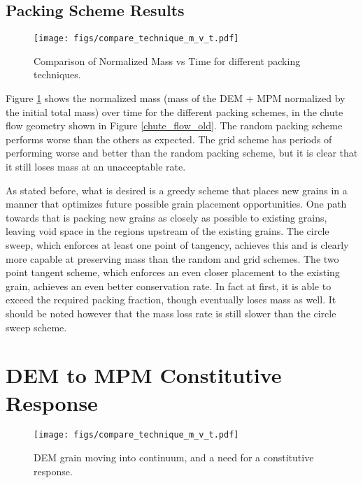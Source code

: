 \subsection{Packing Scheme Results}

\begin{figure}[htp] 
    \centering
    \texttt{[image: figs/compare\_technique\_m\_v\_t.pdf]}
    \caption{Comparison of Normalized Mass vs Time for different packing techniques.}
    \label{packing_compare}
\end{figure}

Figure \ref{packing_compare} shows the normalized mass (mass of the DEM + MPM normalized by the initial total mass) over time for the different packing schemes, in the chute flow geometry shown in Figure \ref{chute_flow_old}. The random packing scheme performs worse than the others as expected. The grid scheme has periods of performing worse and better than the random packing scheme, but it is clear that it still loses mass at an unacceptable rate.

As stated before, what is desired is a greedy scheme that places new grains in a manner that optimizes future possible grain placement opportunities. One path towards that is packing new grains as closely as possible to existing grains, leaving void space in the regions upstream of the existing grains. The circle sweep, which enforces at least one point of tangency, achieves this and is clearly more capable at preserving mass than the random and grid schemes. The two point tangent scheme, which enforces an even closer placement to the existing grain, achieves an even better conservation rate. In fact at first, it is able to exceed the required packing fraction, though eventually loses mass as well. It should be noted however that the mass loss rate is still slower than the circle sweep scheme.

\section{DEM to MPM Constitutive Response}
\begin{figure}[htp] 
    \centering
    \texttt{[image: figs/compare\_technique\_m\_v\_t.pdf]}
    \caption{DEM grain moving into continuum, and a need for a constitutive response.}
    \label{lack_of_response}
\end{figure}

